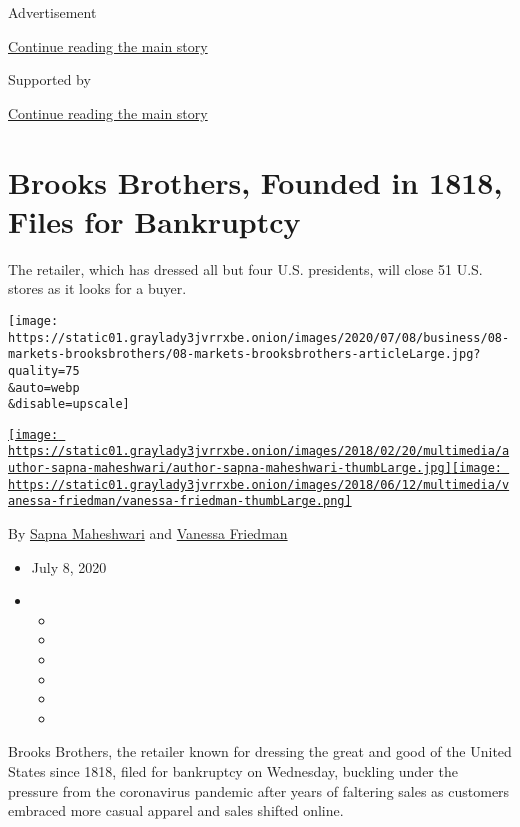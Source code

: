 Advertisement

\protect\hyperlink{after-top}{Continue reading the main story}

Supported by

\protect\hyperlink{after-sponsor}{Continue reading the main story}

\hypertarget{brooks-brothers-founded-in-1818-files-for-bankruptcy}{%
\section{Brooks Brothers, Founded in 1818, Files for
Bankruptcy}\label{brooks-brothers-founded-in-1818-files-for-bankruptcy}}

The retailer, which has dressed all but four U.S. presidents, will close
51 U.S. stores as it looks for a buyer.

\texttt{[image: https://static01.graylady3jvrrxbe.onion/images/2020/07/08/business/08-markets-brooksbrothers/08-markets-brooksbrothers-articleLarge.jpg?quality=75\\\&auto=webp\\\&disable=upscale]}

\href{https://www.nytimes3xbfgragh.onion/by/sapna-maheshwari}{\texttt{[image: https://static01.graylady3jvrrxbe.onion/images/2018/02/20/multimedia/author-sapna-maheshwari/author-sapna-maheshwari-thumbLarge.jpg]}}\href{https://www.nytimes3xbfgragh.onion/by/vanessa-friedman}{\texttt{[image: https://static01.graylady3jvrrxbe.onion/images/2018/06/12/multimedia/vanessa-friedman/vanessa-friedman-thumbLarge.png]}}

By \href{https://www.nytimes3xbfgragh.onion/by/sapna-maheshwari}{Sapna
Maheshwari} and
\href{https://www.nytimes3xbfgragh.onion/by/vanessa-friedman}{Vanessa
Friedman}

\begin{itemize}
\item
  July 8, 2020
\item
  \begin{itemize}
  \item
  \item
  \item
  \item
  \item
  \item
  \end{itemize}
\end{itemize}

Brooks Brothers, the retailer known for dressing the great and good of
the United States since 1818, filed for bankruptcy on Wednesday,
buckling under the pressure from the coronavirus pandemic after years of
faltering sales as customers embraced more casual apparel and sales
shifted online.


